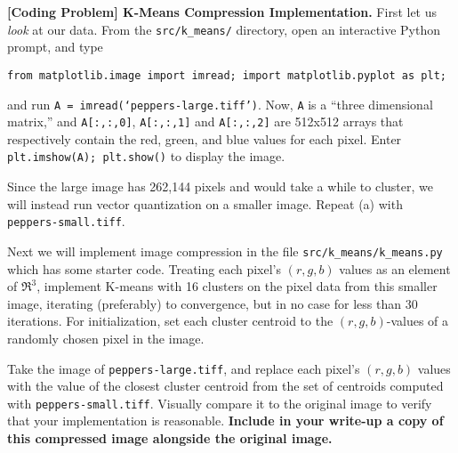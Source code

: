 \item{}
\textbf{[Coding Problem] K-Means Compression Implementation.}
First let us \emph{look} at our data. From the \texttt{src/k\_means/} directory, open an interactive Python prompt, and type
%
\begin{center}
  \texttt{from matplotlib.image import imread; import matplotlib.pyplot as plt;}
\end{center}
%
and run \texttt{A = imread(`peppers-large.tiff')}. Now, \texttt{A} is a ``three dimensional matrix,'' and \texttt{A[:,:,0]}, \texttt{A[:,:,1]} and \texttt{A[:,:,2]} are 512x512 arrays that respectively contain the red, green, and blue values for each pixel. Enter \texttt{plt.imshow(A); plt.show()} to display the image.

Since the large image has 262,144 pixels and would take a while to cluster, we will instead run vector quantization on a smaller image. Repeat (a) with \texttt{peppers-small.tiff}.


Next we will implement image compression in the file \texttt{src/k\_means/k\_means.py} which has some starter code. Treating each pixel's $(r, g, b)$ values as an element of $\Re^3$, implement K-means with 16 clusters on the pixel data from this smaller image, iterating (preferably) to convergence, but in no case for less than 30 iterations. For initialization, set each cluster centroid to the $(r, g, b)$-values of a randomly chosen pixel in the image.

Take the image of \texttt{peppers-large.tiff}, and replace each pixel's $(r, g, b)$ values with the value of the closest cluster centroid from the set of centroids computed with \texttt{peppers-small.tiff}. Visually compare it to the original image to verify that your implementation is reasonable. \textbf{Include in your write-up a copy of this compressed image alongside the original image.}

